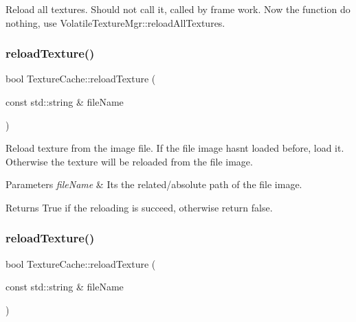 Reload all textures. Should not call it, called by frame work. Now the function do nothing, use Volatile\+Texture\+Mgr\+::reload\+All\+Textures. \mbox{\label{classTextureCache_a6063d9bceafa8a6f60c498f8e2c15b4a}} 
\subsubsection{\texorpdfstring{reload\+Texture()}{reloadTexture()}\hspace{0.1cm}{\footnotesize\ttfamily [1/2]}}
{\footnotesize\ttfamily bool Texture\+Cache\+::reload\+Texture (\begin{DoxyParamCaption}\item[{const std\+::string \&}]{file\+Name }\end{DoxyParamCaption})}

Reload texture from the image file. If the file image hasn\textquotesingle{}t loaded before, load it. Otherwise the texture will be reloaded from the file image. 
\begin{DoxyParams}{Parameters}
{\em file\+Name} & It\textquotesingle{}s the related/absolute path of the file image. \\
\hline
\end{DoxyParams}
\begin{DoxyReturn}{Returns}
True if the reloading is succeed, otherwise return false. 
\end{DoxyReturn}
\mbox{\label{classTextureCache_a6063d9bceafa8a6f60c498f8e2c15b4a}} 
\subsubsection{\texorpdfstring{reload\+Texture()}{reloadTexture()}\hspace{0.1cm}{\footnotesize\ttfamily [2/2]}}
{\footnotesize\ttfamily bool Texture\+Cache\+::reload\+Texture (\begin{DoxyParamCaption}\item[{const std\+::string \&}]{file\+Name }\end{DoxyParamCaption})}

